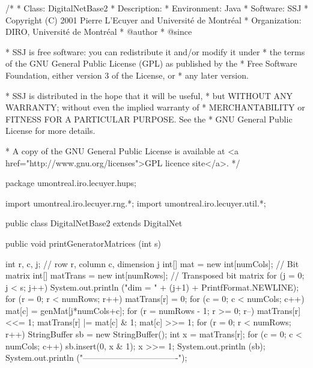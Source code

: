 \begin{code}
\begin{hide}
/*
 * Class:        DigitalNetBase2
 * Description:  
 * Environment:  Java
 * Software:     SSJ 
 * Copyright (C) 2001  Pierre L'Ecuyer and Université de Montréal
 * Organization: DIRO, Université de Montréal
 * @author       
 * @since

 * SSJ is free software: you can redistribute it and/or modify it under
 * the terms of the GNU General Public License (GPL) as published by the
 * Free Software Foundation, either version 3 of the License, or
 * any later version.

 * SSJ is distributed in the hope that it will be useful,
 * but WITHOUT ANY WARRANTY; without even the implied warranty of
 * MERCHANTABILITY or FITNESS FOR A PARTICULAR PURPOSE.  See the
 * GNU General Public License for more details.

 * A copy of the GNU General Public License is available at
   <a href="http://www.gnu.org/licenses">GPL licence site</a>.
 */
\end{hide}
package umontreal.iro.lecuyer.hups;\begin{hide}

import umontreal.iro.lecuyer.rng.*;
import umontreal.iro.lecuyer.util.*;
\end{hide}

public class DigitalNetBase2 extends DigitalNet \begin{hide} {
   private int[] originalMat;    // Original matrices, without randomization.
   protected int[] genMat;       // The current generator matrix.
   protected int[] digitalShift;   // Stores the digital shift vector.
\end{hide}

   public void printGeneratorMatrices (int s) \begin{hide} {
      int r, c, j;                            // row r, column c, dimension j
      int[] mat = new int[numCols];           // Bit matrix
      int[] matTrans = new int[numRows];      // Transposed bit matrix
      for (j = 0; j < s; j++) {
         System.out.println ("dim = " + (j+1) + PrintfFormat.NEWLINE);
         for (r = 0; r < numRows; r++)
            matTrans[r] = 0;
         for (c = 0; c < numCols; c++) {
            mat[c] = genMat[j*numCols+c];
            for (r = numRows - 1; r >= 0; r--) {
               matTrans[r] <<= 1;
               matTrans[r] |= mat[c] & 1;
               mat[c] >>= 1;
            }
         }
         for (r = 0; r < numRows; r++) {
            StringBuffer sb = new StringBuffer();
            int x = matTrans[r];
            for (c = 0; c < numCols; c++) {
               sb.insert(0, x & 1);
               x >>= 1;
            }
            System.out.println (sb);
         }
         System.out.println ("----------------------------------");
      }
   }\end{hide}
\end{code}
